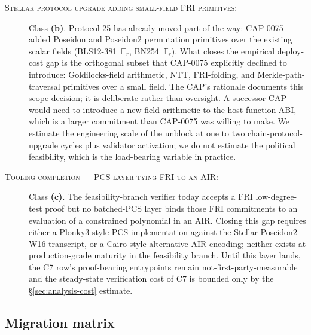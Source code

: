 \begin{description}
  \item[\textsc{Stellar protocol upgrade adding small-field FRI
    primitives}:] Class \textbf{(b)}. Protocol 25 has already moved
    part of the way: CAP-0075~\cite{stellar-cap-0075} added Poseidon
    and Poseidon2 permutation primitives over the existing scalar
    fields (BLS12-381~$\mathbb{F}_r$, BN254~$\mathbb{F}_r$). What
    closes the empirical deploy-cost gap is the orthogonal subset
    that CAP-0075 explicitly declined to introduce: Goldilocks-field
    arithmetic, NTT, FRI-folding, and Merkle-path-traversal
    primitives over a small field. The CAP's rationale documents
    this scope decision; it is deliberate rather than oversight. A
    successor CAP would need to introduce a new field arithmetic to
    the host-function ABI, which is a larger commitment than
    CAP-0075 was willing to make. We estimate the engineering scale
    of the unblock at one to two chain-protocol-upgrade cycles plus
    validator activation; we do not estimate the political
    feasibility, which is the load-bearing variable in practice.
  \item[\textsc{Tooling completion --- PCS layer tying FRI to an
    AIR}:] Class \textbf{(c)}. The feasibility-branch verifier today
    accepts a FRI low-degree-test proof but no batched-PCS layer
    binds those FRI commitments to an evaluation of a constrained
    polynomial in an AIR. Closing this gap requires either a
    Plonky3-style PCS implementation against the Stellar
    Poseidon2-W16 transcript, or a Cairo-style alternative AIR
    encoding; neither exists at production-grade maturity in the
    feasibility branch. Until this layer lands, the C7 row's
    proof-bearing entrypoints remain not-first-party-measurable and
    the steady-state verification cost of C7 is bounded only by the
    \S\ref{sec:analysis-cost} estimate.
\end{description}

\subsection{Migration matrix}
\label{sec:migration-matrix}

